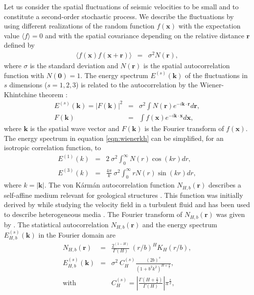 Let us consider the spatial fluctuations of seismic velocities to be small and to 
constitute a second-order stochastic process.
We describe the fluctuations by using different realizations of the random function $f(\mathbf{x})$
with the expectation value $\langle f \rangle = 0$ and with the spatial covariance 
depending on the relative distance $\mathbf{r}$ defined by
\begin{eqnarray}
\langle f(\mathbf{x})f(\mathbf{x}+\mathbf{r})\rangle & = & \sigma^2 N(\mathbf{r}), \label{eqn:covarf}
\end{eqnarray}
where $\sigma$ is the standard deviation and $N(\mathbf{r})$ is the spatial autocorrelation 
function with $N(\mathbf{0})=1$.
The energy spectrum $E^{(s)}(\mathbf{k})$ of the fluctuations in $s$ dimensions ($s=1,2,3$) is
related to the autocorrelation by the Wiener-Khintchine theorem \cite[]{Born_W64}:
\begin{eqnarray}
E^{(s)}(\mathbf{k}) = |F(\mathbf{k})|^2 & = & 
\sigma^2\int N(\mathbf{r})e^{-i\mathbf{k}\cdot\mathbf{r}}d\mathbf{r}, \label{eqn:wienerkh}\\
F(\mathbf{k}) & = & \int f(\mathbf{x})e^{-i\mathbf{k}\cdot\mathbf{x}}d\mathbf{x},
\end{eqnarray}
where $\mathbf{k}$ is the spatial wave vector and $F(\mathbf{k})$ is the Fourier transform of $f(\mathbf{x})$.
The energy spectrum in equation \ref{eqn:wienerkh} can be simplified, for an isotropic correlation function, to
\begin{eqnarray}
E^{(1)}(k) & = & 2~\sigma^2\int_{0}^{\infty}N(r)\cos(kr)dr, \label{eqn:etf1d}\\
E^{(3)}(k) & = & \frac{4\pi}{k}~\sigma^2\int_{0}^{\infty} rN(r)\sin(kr)dr, \label{eqn:etf3d}
\end{eqnarray}
where $k=|\mathbf{k}|$.  The von K\'arm\'an autocorrelation function
$N_{H,b}(\mathbf{r})$ describes a self-affine medium relevant for
geological structures
\cite[]{Goff_J88,Holliger_L92,Dolan_BR98,Sato_F98,Klimes_02,Goff_H03}.
This function was initially derived by \cite{Vonkarman_48} while
studying the velocity field in a turbulent fluid and has been used to
describe heterogeneous media \cite[]{Tatarski_61,Frankel_C86}.  The
Fourier transform of $N_{H,b}(\mathbf{r})$ was given by
\cite{Lord_54}.  The statistical autocorrelation $N_{H,b}(\mathbf{r})$
and the energy spectrum $E^{(s)}_{H,b}(\mathbf{k})$ in the Fourier
domain are
\begin{eqnarray}
N_{H,b}(\mathbf{r}) & = & \frac{2^{(1-H)}}{\Gamma(H)}~(r/b)^{H}K_{H}(r/b),\label{eqn:vkacf}\\
E^{(s)}_{H,b}(\mathbf{k}) & = & \sigma^2~C^{(s)}_{H}
\frac{\left(2b\right)^s}{\left(1+b^2k^2\right)^{H+\frac{s}{2}}},\label{eqn:vkes} \\
\mbox{with} & & C^{(s)}_{H}=\left|\frac{\Gamma(H+\frac{s}{2})}{\Gamma(H)}\right|\pi^{\frac{s}{2}}, \label{eqn:calpha}
\end{eqnarray}
